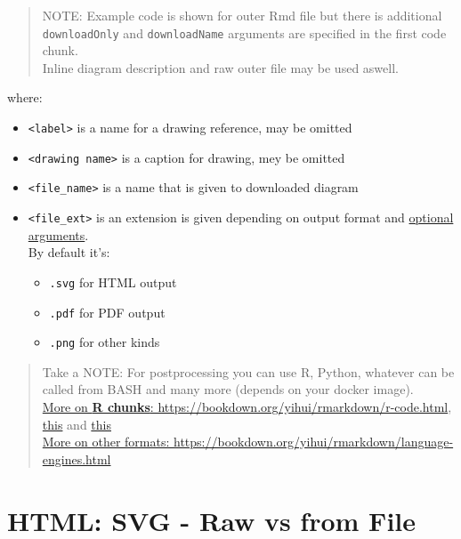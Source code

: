\documentclass[
  12pt,
  a4paper,
  12pt,
  oneside,
  openany]{book}
\providecommand{\tightlist}{%
  \setlength{\itemsep}{0pt}\setlength{\parskip}{0pt}}
\begin{document}
\begin{quote}
NOTE: Example code is shown for outer Rmd file but there is additional \texttt{downloadOnly} and \texttt{downloadName} arguments are specified in the first code chunk.\\
Inline diagram description and raw outer file may be used aswell.
\end{quote}

where:

\begin{itemize}
\tightlist
\item
  \texttt{\textless{}label\textgreater{}} is a name for a drawing reference, may be omitted
\item
  \texttt{\textless{}drawing\ name\textgreater{}} is a caption for drawing, mey be omitted
\item
  \texttt{\textless{}file\_name\textgreater{}} is a name that is given to downloaded diagram
\item
  \texttt{\textless{}file\_ext\textgreater{}} is an extension is given depending on output format and \protect\hyperlink{usage-args-format}{optional arguments}.\\
  By default it's:

  \begin{itemize}
  \tightlist
  \item
    \texttt{.svg} for HTML output
  \item
    \texttt{.pdf} for PDF output
  \item
    \texttt{.png} for other kinds
  \end{itemize}
\end{itemize}

\begin{quote}
Take a NOTE: For postprocessing you can use R, Python, whatever can be called from BASH and many more (depends on your docker image).\\
\href{https://bookdown.org/yihui/rmarkdown/r-code.html}{More on \textbf{R chunks}: https://bookdown.org/yihui/rmarkdown/r-code.html}, \href{https://yihui.org/knitr/options/}{this} and \href{https://yihui.org/knitr/hooks/}{this}\\
\href{https://bookdown.org/yihui/rmarkdown/language-engines.html}{More on other formats: https://bookdown.org/yihui/rmarkdown/language-engines.html}
\end{quote}

\hypertarget{usage-svg}{%
\section{HTML: SVG - Raw vs from File}\label{usage-svg}}
\end{document}
